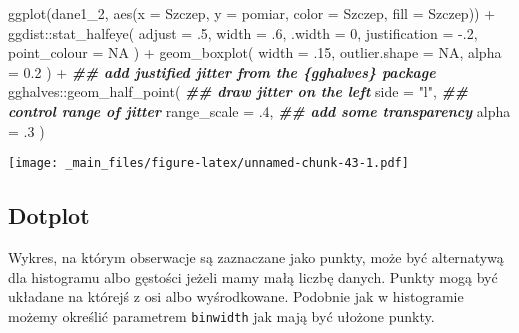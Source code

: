 \documentclass[
]{book}
\newenvironment{Shaded}{\begin{snugshade}}{\end{snugshade}}
\newcommand{\AttributeTok}[1]{\textcolor[rgb]{0.77,0.63,0.00}{#1}}
\newcommand{\ConstantTok}[1]{\textcolor[rgb]{0.00,0.00,0.00}{#1}}
\newcommand{\DecValTok}[1]{\textcolor[rgb]{0.00,0.00,0.81}{#1}}
\newcommand{\DocumentationTok}[1]{\textcolor[rgb]{0.56,0.35,0.01}{\textbf{\textit{#1}}}}
\newcommand{\FloatTok}[1]{\textcolor[rgb]{0.00,0.00,0.81}{#1}}
\newcommand{\FunctionTok}[1]{\textcolor[rgb]{0.00,0.00,0.00}{#1}}
\newcommand{\NormalTok}[1]{#1}
\newcommand{\SpecialCharTok}[1]{\textcolor[rgb]{0.00,0.00,0.00}{#1}}
\newcommand{\StringTok}[1]{\textcolor[rgb]{0.31,0.60,0.02}{#1}}
\begin{document}
\begin{Shaded}
\begin{Highlighting}[]
\FunctionTok{ggplot}\NormalTok{(dane1\_2, }\FunctionTok{aes}\NormalTok{(}\AttributeTok{x =}\NormalTok{ Szczep, }\AttributeTok{y =}\NormalTok{ pomiar, }\AttributeTok{color =}\NormalTok{ Szczep, }\AttributeTok{fill =}\NormalTok{ Szczep)) }\SpecialCharTok{+} 
\NormalTok{  ggdist}\SpecialCharTok{::}\FunctionTok{stat\_halfeye}\NormalTok{(}
    \AttributeTok{adjust =}\NormalTok{ .}\DecValTok{5}\NormalTok{, }
    \AttributeTok{width =}\NormalTok{ .}\DecValTok{6}\NormalTok{, }
    \AttributeTok{.width =} \DecValTok{0}\NormalTok{, }
    \AttributeTok{justification =} \SpecialCharTok{{-}}\NormalTok{.}\DecValTok{2}\NormalTok{, }
    \AttributeTok{point\_colour =} \ConstantTok{NA}
\NormalTok{  ) }\SpecialCharTok{+} 
  \FunctionTok{geom\_boxplot}\NormalTok{(}
    \AttributeTok{width =}\NormalTok{ .}\DecValTok{15}\NormalTok{, }
    \AttributeTok{outlier.shape =} \ConstantTok{NA}\NormalTok{,}
    \AttributeTok{alpha =} \FloatTok{0.2}
\NormalTok{  ) }\SpecialCharTok{+}
  \DocumentationTok{\#\# add justified jitter from the \{gghalves\} package}
\NormalTok{  gghalves}\SpecialCharTok{::}\FunctionTok{geom\_half\_point}\NormalTok{(}
    \DocumentationTok{\#\# draw jitter on the left}
    \AttributeTok{side =} \StringTok{"l"}\NormalTok{, }
    \DocumentationTok{\#\# control range of jitter}
    \AttributeTok{range\_scale =}\NormalTok{ .}\DecValTok{4}\NormalTok{, }
    \DocumentationTok{\#\# add some transparency}
    \AttributeTok{alpha =}\NormalTok{ .}\DecValTok{3}
\NormalTok{  ) }
\end{Highlighting}
\end{Shaded}

\texttt{[image: \_main\_files/figure-latex/unnamed-chunk-43-1.pdf]}

\hypertarget{dotplot}{%
\subsection{Dotplot}\label{dotplot}}

Wykres, na którym obserwacje są zaznaczane jako punkty, może być alternatywą dla histogramu albo gęstości jeżeli mamy małą liczbę danych. Punkty mogą być układane na którejś z osi albo wyśrodkowane. Podobnie jak w histogramie możemy określić parametrem \texttt{binwidth} jak mają być ułożone punkty.
\end{document}
